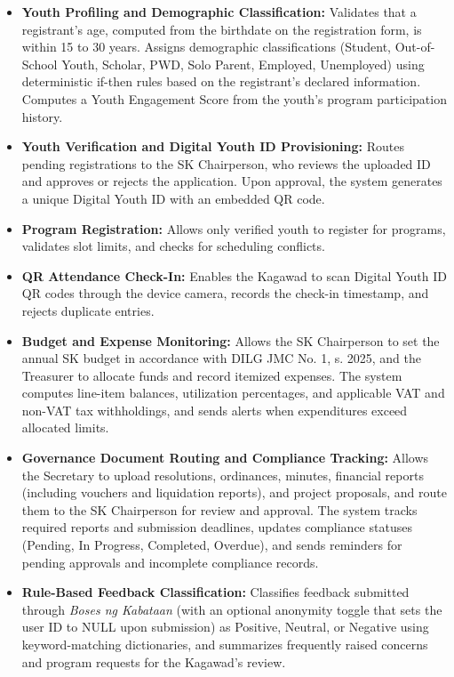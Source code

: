 \begin{itemize}
    \item \textbf{Youth Profiling and Demographic Classification:} Validates that a registrant's age, computed from the birthdate on the registration form, is within 15 to 30 years. Assigns demographic classifications (Student, Out-of-School Youth, Scholar, PWD, Solo Parent, Employed, Unemployed) using deterministic if-then rules based on the registrant's declared information. Computes a Youth Engagement Score from the youth's program participation history.
    \item \textbf{Youth Verification and Digital Youth ID Provisioning:} Routes pending registrations to the SK Chairperson, who reviews the uploaded ID and approves or rejects the application. Upon approval, the system generates a unique Digital Youth ID with an embedded QR code.
    \item \textbf{Program Registration:} Allows only verified youth to register for programs, validates slot limits, and checks for scheduling conflicts.
    \item \textbf{QR Attendance Check-In:} Enables the Kagawad to scan Digital Youth ID QR codes through the device camera, records the check-in timestamp, and rejects duplicate entries.
    \item \textbf{Budget and Expense Monitoring:} Allows the SK Chairperson to set the annual SK budget in accordance with DILG JMC No. 1, s. 2025, and the Treasurer to allocate funds and record itemized expenses. The system computes line-item balances, utilization percentages, and applicable VAT and non-VAT tax withholdings, and sends alerts when expenditures exceed allocated limits.
    \item \textbf{Governance Document Routing and Compliance Tracking:} Allows the Secretary to upload resolutions, ordinances, minutes, financial reports (including vouchers and liquidation reports), and project proposals, and route them to the SK Chairperson for review and approval. The system tracks required reports and submission deadlines, updates compliance statuses (Pending, In Progress, Completed, Overdue), and sends reminders for pending approvals and incomplete compliance records.
    \item \textbf{Rule-Based Feedback Classification:} Classifies feedback submitted through \textit{Boses ng Kabataan} (with an optional anonymity toggle that sets the user ID to NULL upon submission) as Positive, Neutral, or Negative using keyword-matching dictionaries, and summarizes frequently raised concerns and program requests for the Kagawad's review.

\end{itemize}
